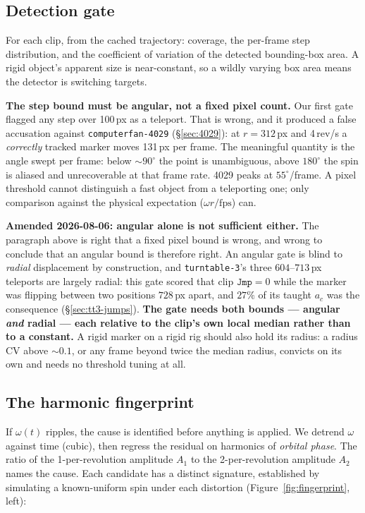 \documentclass[11pt,a4paper]{article}
\begin{document}
\subsection{Detection gate}
\label{sec:detection-gate}

For each clip, from the cached trajectory: coverage, the per-frame step distribution, and the
coefficient of variation of the detected bounding-box area. A rigid object's apparent size is
near-constant, so a wildly varying box area means the detector is switching targets.

\textbf{The step bound must be angular, not a fixed pixel count.} Our first gate flagged any
step over 100\,px as a teleport. That is wrong, and it produced a false accusation against
\texttt{computerfan-4029} (\S\ref{sec:4029}): at $r = 312$\,px and 4\,rev/s a \emph{correctly}
tracked marker moves 131\,px per frame. The meaningful quantity is the angle swept per frame:
below ${\sim}90^\circ$ the point is unambiguous, above $180^\circ$ the spin is aliased and
unrecoverable at that frame rate. 4029 peaks at $55^\circ$/frame. A pixel threshold cannot
distinguish a fast object from a teleporting one; only comparison against the physical
expectation ($\omega r/\mathrm{fps}$) can.

\textbf{Amended 2026-08-06: angular alone is not sufficient either.} The paragraph above is
right that a fixed pixel bound is wrong, and wrong to conclude that an angular bound is
therefore right. An angular gate is blind to \emph{radial} displacement by construction, and
\texttt{turntable-3}'s three $604$--$713$\,px teleports are largely radial: this gate scored that
clip $\mathtt{Jmp} = 0$ while the marker was flipping between two positions $728$\,px apart, and
$27\%$ of its taught $a_c$ was the consequence (\S\ref{sec:tt3-jumps}). \textbf{The gate needs
both bounds --- angular \emph{and} radial --- each relative to the clip's own local median rather
than to a constant.} A rigid marker on a rigid rig should also hold its radius: a radius CV above
${\sim}0.1$, or any frame beyond twice the median radius, convicts on its own and needs no
threshold tuning at all.

\subsection{The harmonic fingerprint}
\label{sec:fingerprint}

If $\omega(t)$ ripples, the cause is identified before anything is applied. We detrend $\omega$
against time (cubic), then regress the residual on harmonics of \emph{orbital phase}. The ratio
of the 1-per-revolution amplitude $A_1$ to the 2-per-revolution amplitude $A_2$ names the cause.
Each candidate has a distinct signature, established by simulating a known-uniform spin under
each distortion (Figure~\ref{fig:fingerprint}, left):
\end{document}
